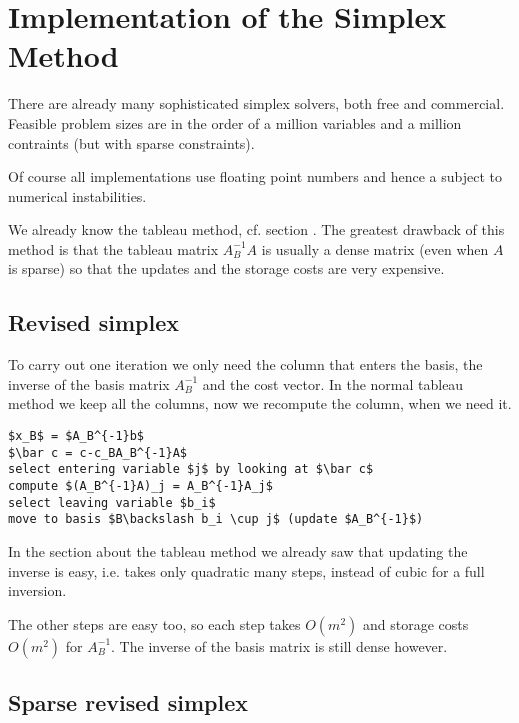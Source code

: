 \section{Implementation of the Simplex Method}

There are already many sophisticated simplex solvers, both free and commercial. Feasible problem sizes are in the order of a million variables and a million contraints (but with sparse constraints). 

Of course all implementations use floating point numbers and hence a subject to numerical instabilities. 

We already know the tableau method, cf. section \label{sec:tableau}. The greatest drawback of this method is that the tableau matrix $A_B^{-1}A$ is usually a dense matrix (even when $A$ is sparse) so that the updates and the storage costs are very expensive.

\subsection{Revised simplex}

To carry out one iteration we only need the column that enters the basis, the inverse of the basis matrix $A_B^{-1}$ and the cost vector. In the normal tableau method we keep all the columns, now we recompute the column, when we need it.

\begin{lstlisting}
$x_B$ = $A_B^{-1}b$
$\bar c = c-c_BA_B^{-1}A$
select entering variable $j$ by looking at $\bar c$
compute $(A_B^{-1}A)_j = A_B^{-1}A_j$
select leaving variable $b_i$
move to basis $B\backslash b_i \cup j$ (update $A_B^{-1}$)
\end{lstlisting}

In the section about the tableau method we already saw that updating the inverse is easy, i.e. takes only quadratic many steps, instead of cubic for a full inversion. %

The other steps are easy too, so each step takes $O(m^2)$ and storage costs $O(m^2)$ for $A_B^{-1}$. The inverse of the basis matrix is still dense however.

\subsection{Sparse revised simplex}

